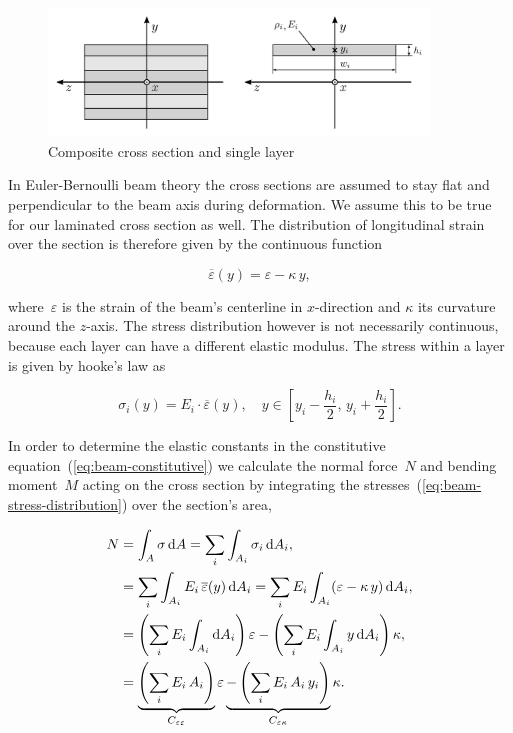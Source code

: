 \begin{figure}[h]
\centering
\includegraphics[width=0.9\textwidth]{figures/elements/composite-sections-1}
\caption{Composite cross section and single layer}
\label{fig:composite-sections-1}
\end{figure}

In Euler-Bernoulli beam theory the cross sections are assumed to stay flat and perpendicular to the beam axis during deformation.
We assume this to be true for our laminated cross section as well.
The distribution of longitudinal strain over the section is therefore given by the continuous function

\begin{equation}
\overline{\varepsilon}(y) = \varepsilon - \kappa\,y,
\end{equation}

where~$\varepsilon$ is the strain of the beam's centerline in $x$-direction and $\kappa$ its curvature around the $z$-axis.
The stress distribution however is not necessarily continuous, because each layer can have a different elastic modulus.
The stress within a layer is given by hooke's law as

\begin{equation}
\sigma_i(y) = E_i\cdot\overline{\varepsilon}(y),\quad y \in [y_i - \frac{h_i}{2},\,y_i + \frac{h_i}{2}].\label{eq:beam-stress-distribution}
\end{equation}

In order to determine the elastic constants in the constitutive equation~(\ref{eq:beam-constitutive}) we calculate the normal force~$N$ and bending moment~$M$ acting on the cross section by integrating the stresses~(\ref{eq:beam-stress-distribution}) over the section's area,

\begin{align}
N &= \int_A \sigma\,\mathrm{d}A = \sum_i\int_{A_i}\sigma_i\,\mathrm{d}A_i,\notag\\
&= \sum_i\int_{A_i}E_i\,\overline{\varepsilon}(y)\,\mathrm{d}A_i = \sum_i E_i \int_{A_i}(\varepsilon - \kappa\,y)\,\mathrm{d}A_i,\notag\\
&= \left(\sum_i E_i\int_{A_i}\mathrm{d}A_i\right)\varepsilon - \left(\sum_i E_i\int_{A_i}y\,\mathrm{d}A_i\right)\kappa,\notag\\
&=
\underbrace{
\left(\sum_i E_i\,A_i\right)
}_{C_{\varepsilon\varepsilon}}
\varepsilon
\underbrace{
- \left(\sum_i E_i\,A_i\,y_i\right)
}_{C_{\varepsilon\kappa}}
\kappa.\label{eq:elements:beam:constitutive_1}
\end{align}

